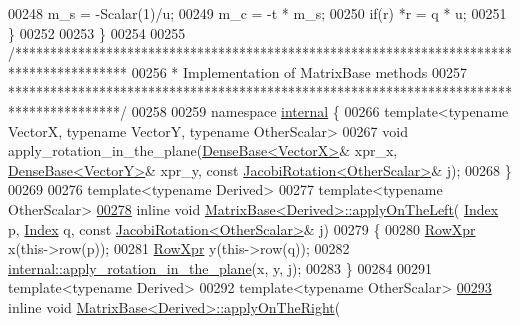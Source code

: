 \begin{DoxyCode}
00248     m\_s = -Scalar(1)/u;
00249     m\_c = -t * m\_s;
00250     \textcolor{keywordflow}{if}(r) *r = q * u;
00251   \}
00252 
00253 \}
00254 
00255 \textcolor{comment}{/****************************************************************************************}
00256 \textcolor{comment}{*   Implementation of MatrixBase methods}
00257 \textcolor{comment}{****************************************************************************************/}
00258 
00259 \textcolor{keyword}{namespace }\hyperlink{namespaceinternal}{internal} \{
00266 \textcolor{keyword}{template}<\textcolor{keyword}{typename} VectorX, \textcolor{keyword}{typename} VectorY, \textcolor{keyword}{typename} OtherScalar>
00267 \textcolor{keywordtype}{void} apply\_rotation\_in\_the\_plane(\hyperlink{group___core___module_class_eigen_1_1_dense_base}{DenseBase<VectorX>}& xpr\_x, 
      \hyperlink{group___core___module_class_eigen_1_1_dense_base}{DenseBase<VectorY>}& xpr\_y, \textcolor{keyword}{const} \hyperlink{group___jacobi___module_class_eigen_1_1_jacobi_rotation}{JacobiRotation<OtherScalar>}& 
      j);
00268 \}
00269 
00276 \textcolor{keyword}{template}<\textcolor{keyword}{typename} Derived>
00277 \textcolor{keyword}{template}<\textcolor{keyword}{typename} OtherScalar>
\hyperlink{group___core___module_ae669131f6e18f7e8f06fae271754f435}{00278} \textcolor{keyword}{inline} \textcolor{keywordtype}{void} \hyperlink{group___core___module_a3a08ad41e81d8ad4a37b5d5c7490e765}{MatrixBase<Derived>::applyOnTheLeft}(
      \hyperlink{namespace_eigen_a62e77e0933482dafde8fe197d9a2cfde}{Index} p, \hyperlink{namespace_eigen_a62e77e0933482dafde8fe197d9a2cfde}{Index} q, \textcolor{keyword}{const} \hyperlink{group___jacobi___module_class_eigen_1_1_jacobi_rotation}{JacobiRotation<OtherScalar>}& j)
00279 \{
00280   \hyperlink{group___core___module_class_eigen_1_1_block}{RowXpr} x(this->row(p));
00281   \hyperlink{group___core___module_class_eigen_1_1_block}{RowXpr} y(this->row(q));
00282   \hyperlink{namespace_eigen_1_1internal_a5f7738a5c56c9b9decf94d9728ba7906}{internal::apply\_rotation\_in\_the\_plane}(x, y, j);
00283 \}
00284 
00291 \textcolor{keyword}{template}<\textcolor{keyword}{typename} Derived>
00292 \textcolor{keyword}{template}<\textcolor{keyword}{typename} OtherScalar>
\hyperlink{group___jacobi___module_gaa07f741c86219601664433777827bf1c}{00293} \textcolor{keyword}{inline} \textcolor{keywordtype}{void} \hyperlink{group___core___module_a45d91752925d2757fc8058a293b15462}{MatrixBase<Derived>::applyOnTheRight}(

\end{DoxyCode}

